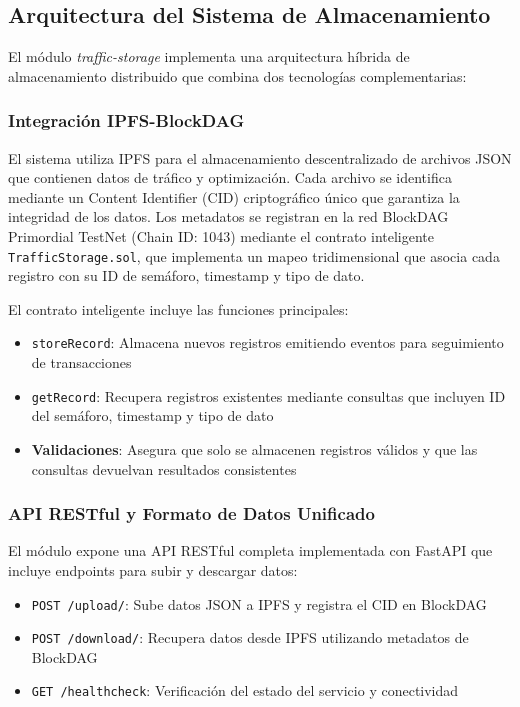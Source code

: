 \documentclass[onecolumn]{article}
\begin{document}
\subsection{Arquitectura del Sistema de Almacenamiento}

El módulo \textit{traffic-storage} implementa una arquitectura híbrida de almacenamiento distribuido que combina dos tecnologías complementarias:

\subsubsection{Integración IPFS-BlockDAG}

El sistema utiliza IPFS para el almacenamiento descentralizado de archivos JSON que contienen datos de tráfico y optimización. Cada archivo se identifica mediante un Content Identifier (CID) criptográfico único que garantiza la integridad de los datos. Los metadatos se registran en la red BlockDAG Primordial TestNet (Chain ID: 1043) mediante el contrato inteligente \texttt{TrafficStorage.sol}, que implementa un mapeo tridimensional que asocia cada registro con su ID de semáforo, timestamp y tipo de dato.

El contrato inteligente incluye las funciones principales:
\begin{itemize}
    \item \texttt{storeRecord}: Almacena nuevos registros emitiendo eventos para seguimiento de transacciones
    \item \texttt{getRecord}: Recupera registros existentes mediante consultas que incluyen ID del semáforo, timestamp y tipo de dato
    \item \textbf{Validaciones}: Asegura que solo se almacenen registros válidos y que las consultas devuelvan resultados consistentes
\end{itemize}

\subsubsection{API RESTful y Formato de Datos Unificado}

El módulo expone una API RESTful completa implementada con FastAPI que incluye endpoints para subir y descargar datos:

\begin{itemize}
    \item \texttt{POST /upload/}: Sube datos JSON a IPFS y registra el CID en BlockDAG
    \item \texttt{POST /download/}: Recupera datos desde IPFS utilizando metadatos de BlockDAG
    \item \texttt{GET /healthcheck}: Verificación del estado del servicio y conectividad
\end{itemize}
\end{document}
